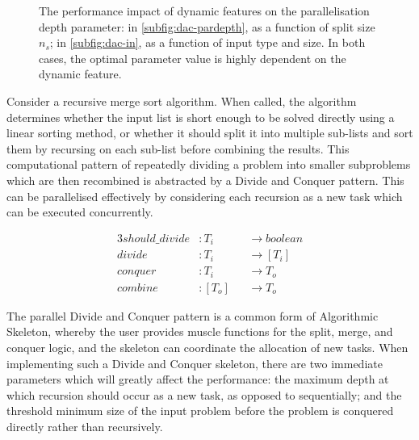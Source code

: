 \begin{figure*}[!b]
\centering

\caption{The performance impact of dynamic features on the
  parallelisation depth parameter: in \ref{subfig:dac-pardepth}, as a
  function of split size $n_s$; in \ref{subfig:dac-in}, as a function
  of input type and size. In both cases, the optimal parameter value
  is highly dependent on the dynamic feature.}
\label{fig:dac}
\end{figure*}

Consider a recursive merge sort algorithm. When called, the algorithm
determines whether the input list is short enough to be solved
directly using a linear sorting method, or whether it should split it
into multiple sub-lists and sort them by recursing on each sub-list
before combining the results. This computational pattern of repeatedly
dividing a problem into smaller subproblems which are then recombined
is abstracted by a Divide and Conquer pattern. This can be
parallelised effectively by considering each recursion as a new task
which can be executed concurrently.



\begin{alignat*}{3}
should\_divide &: T_i & &\rightarrow boolean\\
divide &: T_i & &\rightarrow [T_i]\\
conquer &: T_i & &\rightarrow T_o\\
combine &: [T_o] & &\rightarrow T_o
\end{alignat*}

The parallel Divide and Conquer pattern is a common form of
Algorithmic Skeleton, whereby the user provides muscle functions for
the split, merge, and conquer logic, and the skeleton can coordinate
the allocation of new tasks. When implementing such a Divide and
Conquer skeleton, there are two immediate parameters which will
greatly affect the performance: the maximum depth at which recursion
should occur as a new task, as opposed to sequentially; and the
threshold minimum size of the input problem before the problem is
conquered directly rather than recursively.

